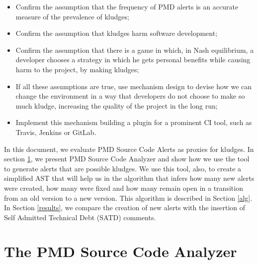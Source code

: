\documentclass[
]{article}
\begin{document}
\begin{itemize}
\item
  Confirm the assumption that the frequency of PMD alerts is an accurate
  measure of the prevalence of kludges;
  
\item
  Confirm the assumption that kludges harm software development;

\item
  Confirm the assumption that there is a game in which, in Nash
  equilibrium, a developer chooses a strategy in which he gets personal
  benefits while causing harm to the project, by making kludges;

\item
  If all these assumptions are true, use mechanism design to devise how
  we can change the environment in a way that developers do not choose
  to make so much kludge, increasing the quality of the project in the
  long run;

\item
  Implement this mechanism building a plugin for a prominent CI tool,
  such as Travis, Jenkins or GitLab.
\end{itemize}

In this document, we evaluate PMD Source Code Alerts as proxies for
kludges. In section \ref{pmd}, we present PMD Source Code Analyzer and
show how we use the tool to generate alerts that are possible kludges.
We use this tool, also, to create a simplified AST that will help us in
the algorithm that infers how many new alerts were created, how many
were fixed and how many remain open in a transition from an old version
to a new version. This algorithm is described in Section \ref{alg}. In
Section \ref{results}, we compare the creation of new alerts with the
insertion of Self Admitted Technical Debt (SATD) comments.

%
%

\section{The PMD Source Code Analyzer}\label{pmd}
\end{document}
